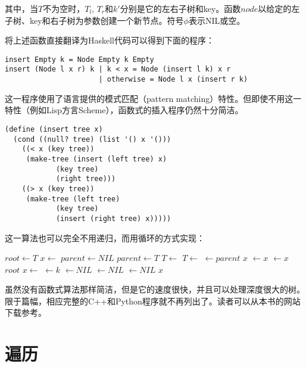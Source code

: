 \documentclass{ctexart}
\begin{document}
其中，当$T$不为空时，$T_l$, $T_r$和$k'$分别是它的左右子树和key。函数$node$以给定的左子树、key和右子树为参数创建一个新节点。符号$\phi$表示NIL或空。

将上述函数直接翻译为Haskell代码可以得到下面的程序：

\begin{lstlisting}[style=Haskell]
insert Empty k = Node Empty k Empty
insert (Node l x r) k | k < x = Node (insert l k) x r
                      | otherwise = Node l x (insert r k)
\end{lstlisting}

这一程序使用了语言提供的模式匹配（pattern matching）特性。但即使不用这一特性（例如Lisp方言Scheme），函数式的插入程序仍然十分简洁。

\lstset{language=lisp}
\begin{lstlisting}
(define (insert tree x)
  (cond ((null? tree) (list '() x '()))
	((< x (key tree))
	 (make-tree (insert (left tree) x)
		    (key tree)
		    (right tree)))
	((> x (key tree))
	 (make-tree (left tree)
		    (key tree)
		    (insert (right tree) x)))))
\end{lstlisting}

这一算法也可以完全不用递归，而用循环的方式实现：

\begin{algorithmic}[1]
  \State $root \gets T$
  \State $x \gets$ 
  \State $parent \gets NIL$
    \State $parent \gets T$
      \State $T \gets $ 
    \Else
      \State $T \gets $ 
    \EndIf
  \EndWhile
  \State {} $\gets parent$
   
    \State \Return $x$
    \State {} $\gets x$
  \Else
    \State {} $\gets x$
  \EndIf
  \State \Return $root$
\EndFunction
\Statex
{}
  \State $x \gets $ 
  \State {} $ \gets k$
  \State {} $ \gets NIL$
  \State {} $ \gets NIL$
  \State {} $ \gets NIL$
  \State \Return $x$
\EndFunction
\end{algorithmic}

虽然没有函数式算法那样简洁，但是它的速度很快，并且可以处理深度很大的树。限于篇幅，相应完整的C++和Python程序就不再列出了。读者可以从本书的网站下载参考。

\section{遍历}
\end{document}
